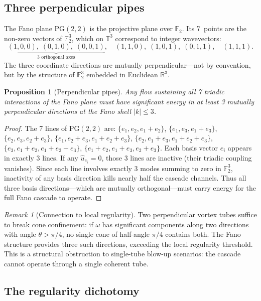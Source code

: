 \documentclass[11pt]{article}
\newtheorem{proposition}[theorem]{Proposition}
\theoremstyle{definition}
\theoremstyle{remark}
\newtheorem{remark}[theorem]{Remark}
\begin{document}
\subsection{Three perpendicular pipes}

The Fano plane $\mathrm{PG}(2,2)$ is the projective plane over
$\mathbb{F}_2$. Its 7~points are the non-zero vectors of
$\mathbb{F}_2^3$, which on $\mathbb{T}^3$ correspond to integer
wavevectors:
\[
  \underbrace{(1,0,0),\; (0,1,0),\; (0,0,1)}_{\text{3 orthogonal axes}}
  ,\quad
  (1,1,0),\; (1,0,1),\; (0,1,1),\quad (1,1,1).
\]
The three coordinate directions are mutually perpendicular---not
by convention, but by the structure of $\mathbb{F}_2^3$ embedded
in Euclidean $\mathbb{R}^3$.

\begin{proposition}[Perpendicular pipes]\label{prop:perp-pipes}
Any flow sustaining all 7 triadic interactions of the Fano plane
must have significant energy in at least 3 mutually perpendicular
directions at the Fano shell $|k| \leq 3$.
\end{proposition}

\begin{proof}
The 7 lines of $\mathrm{PG}(2,2)$ are:
$\{e_1, e_2, e_1{+}e_2\}$,
$\{e_1, e_3, e_1{+}e_3\}$,
$\{e_2, e_3, e_2{+}e_3\}$,
$\{e_1, e_2{+}e_3, e_1{+}e_2{+}e_3\}$,
$\{e_2, e_1{+}e_3, e_1{+}e_2{+}e_3\}$,
$\{e_3, e_1{+}e_2, e_1{+}e_2{+}e_3\}$,
$\{e_1{+}e_2, e_1{+}e_3, e_2{+}e_3\}$.
Each basis vector $e_i$ appears in exactly 3 lines.
If any $\hat{u}_{e_i} = 0$, those 3 lines are inactive
(their triadic coupling vanishes).
Since each line involves exactly 3 modes summing to zero
in $\mathbb{F}_2^3$, inactivity of any basis direction
kills nearly half the cascade channels.
Thus all three basis directions---which are mutually
orthogonal---must carry energy for the full Fano
cascade to operate.
\end{proof}

\begin{remark}[Connection to local regularity]
Two perpendicular vortex tubes suffice to break cone
confinement: if $\omega$ has significant components along
two directions with angle $\theta > \pi/4$, no single
cone of half-angle $\pi/4$ contains both.
The Fano structure provides three such directions, exceeding
the local regularity threshold. This is a structural
obstruction to single-tube blow-up scenarios: the cascade
cannot operate through a single coherent tube.
\end{remark}

\subsection{The regularity dichotomy}
\end{document}
